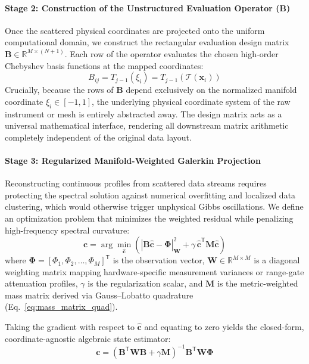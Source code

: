 \paragraph{Stage 2: Construction of the Unstructured Evaluation Operator ($\mathbf{B}$)}
Once the scattered physical coordinates are projected onto the uniform computational domain, we construct the rectangular evaluation design matrix $\mathbf{B} \in \mathbb{R}^{M \times (N+1)}$. Each row of the operator evaluates the chosen high-order Chebyshev basis functions at the mapped coordinates:
\begin{equation}
B_{ij} = T_{j-1}(\xi_i) = T_{j-1}\left(\mathcal{T}(\mathbf{x}_i)\right)
\label{eq:b_matrix_unstructured}
\end{equation}
Crucially, because the rows of $\mathbf{B}$ depend exclusively on the normalized manifold coordinate $\xi_i \in [-1, 1]$, the underlying physical coordinate system of the raw instrument or mesh is entirely abstracted away. The design matrix acts as a universal mathematical interface, rendering all downstream matrix arithmetic completely independent of the original data layout.

\paragraph{Stage 3: Regularized Manifold-Weighted Galerkin Projection}
Reconstructing continuous profiles from scattered data streams requires protecting the spectral solution against numerical overfitting and localized data clustering, which would otherwise trigger unphysical Gibbs oscillations. We define an optimization problem that minimizes the weighted residual while penalizing high-frequency spectral curvature:
\begin{equation}
\mathbf{c} = \arg\min_{\mathbf{\hat{c}}} \left( \left| \mathbf{B}\mathbf{\hat{c}} - \mathbf{\Phi} \right|_{\mathbf{W}}^2 + \gamma \, \mathbf{\hat{c}}^{\mathsf{T}} \mathbf{M} \mathbf{\hat{c}} \right)
\label{eq:regularized_least_squares}
\end{equation}
where $\mathbf{\Phi} = [\Phi_1, \Phi_2, \dots, \Phi_M]^{\mathsf{T}}$ is the observation vector, $\mathbf{W} \in \mathbb{R}^{M \times M}$ is a diagonal weighting matrix mapping hardware-specific measurement variances or range-gate attenuation profiles, $\gamma$ is the regularization scalar, and $\mathbf{M}$ is the metric-weighted mass matrix derived via Gauss--Lobatto quadrature (Eq.~\ref{eq:mass_matrix_quad}).

Taking the gradient with respect to $\mathbf{\hat{c}}$ and equating to zero yields the closed-form, coordinate-agnostic algebraic state estimator:
\begin{equation}
\mathbf{c} = \left( \mathbf{B}^{\mathsf{T}} \mathbf{W} \mathbf{B} + \gamma \mathbf{M} \right)^{-1} \mathbf{B}^{\mathsf{T}} \mathbf{W} \mathbf{\Phi}
\label{eq:p_vt_closed_form}
\end{equation}

